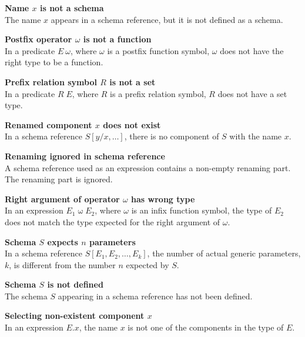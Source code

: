 {{{{{{\begin{trivlist}
\item[]{\bf Name $x$ is not a schema}\\
        The name $x$ appears in a schema reference, but it is not
        defined as a schema. 

\item[]{\bf Postfix operator $\omega$ is not a function}\\
        In a predicate $E~\omega$, where $\omega$ is a postfix
        function symbol, $\omega$ does not have the right type to be a
        function. 

\item[]{\bf Prefix relation symbol $R$ is not a set}\\
        In a predicate $R\;E$, where $R$ is a prefix relation symbol,
        $R$ does not have a set type. 

\item[]{\bf Renamed component $x$ does not exist}\\
        In a schema reference $S[y/x, \dots]$, there is no component
        of $S$ with the name $x$. 

\item[]{\bf Renaming ignored in schema reference}\\
        A schema reference used as an expression contains a non-empty
        renaming part. The renaming part is ignored. 

\item[]{\bf Right argument of operator $\omega$ has wrong type}\\
        In an expression $E_1 \mathbin{\omega} E_2$, where $\omega$
        is an infix function symbol, the type of $E_2$ does not
        match the type expected for the right argument of $\omega$.

\item[]{\bf Schema $S$ expects $n$ parameters}\\
        In a schema reference $S[E_1, E_2, \ldots, E_k]$, the number
        of actual generic parameters, $k$, is different from the number
        $n$ expected by $S$. 

\item[]{\bf Schema $S$ is not defined}\\
        The schema $S$ appearing in a schema reference has not been
        defined.  

\item[]{\bf Selecting non-existent component $x$}\\
        In an expression $E.x$, the name $x$ is not one of the
        components in the type of $E$. 


\end{trivlist}}}}}}}

